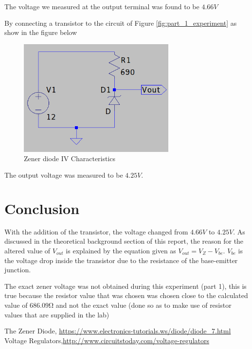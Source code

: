 \documentclass[12pt, a4paper]{article}
\begin{document}
		The voltage we measured at the output terminal was found to be $4.66V$

		By connecting a transistor to the circuit of Figure \ref{fig:part_1_experiment} as show in the figure below 

		\begin{figure}[H]
			\centering
			\includegraphics[width=0.7\textwidth]{Images/Part_2_Experiment.png}
			\caption{Zener diode IV Characteristics}
			\label{fig:part_2_experiment}
		\end{figure}

		The output voltage was measured to be $4.25V$. 
	

	\section{Conclusion} %
	\label{sec:conclusion}
		With the addition of the transistor, the voltage changed from $4.66V$ to $4.25V$. As discussed in the theoretical background section of this report, the reason for the altered value of $V_{out}$ is explained by the equation given as $V_{out} = V_Z - V_{be}$. $V_{be}$ is the voltage drop inside the transistor due to the resistance of the base-emitter junction.

		The exact zener voltage was not obtained during this experiment (part 1), this is true because the resistor value that was chosen was chosen close to the calculated value of $686.09 \si{\ohm}$ and not the exact value (done so as to make use of resistor values that are supplied in the lab)
	

	\begin{thebibliography}{9}
		The Zener Diode, \url{https://www.electronics-tutorials.ws/diode/diode_7.html}
		Voltage Regulators,\url{http://www.circuitstoday.com/voltage-regulators}

	\end{thebibliography}
\end{document}
